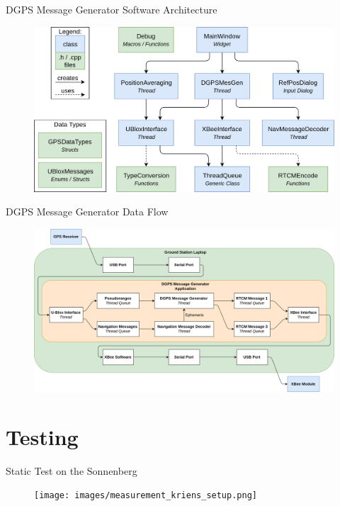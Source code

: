 \documentclass[12pt, compress, xcolor=table]{beamer}
\begin{document}
\begin{frame}{DGPS Message Generator Software Architecture}
 \begin{figure}
  \includegraphics[width=\textwidth]{images/Software_Architecture.png}
 \end{figure}
\end{frame}

\begin{frame}{DGPS Message Generator Data Flow}
 \begin{figure}
  \includegraphics[width=\textwidth]{images/Data_Flow.png}
 \end{figure}
\end{frame}

\section{Testing}

\begin{frame}{Static Test on the Sonnenberg}
 \begin{figure}
  \texttt{[image: images/measurement\_kriens\_setup.png]}
 \end{figure}
\end{frame}
\end{document}
